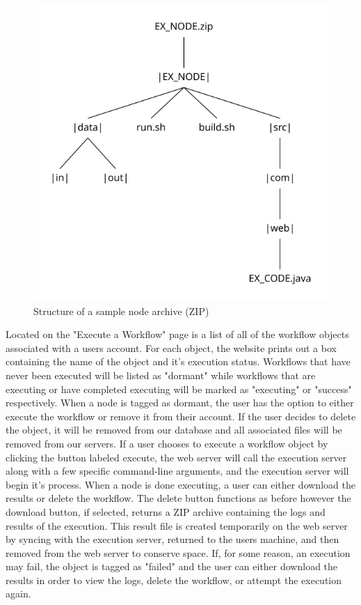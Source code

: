 \documentclass[fleqn,10pt]{SelfArx} %
\begin{document}
\begin{figure}[t!]
\centering
\includegraphics[width=\linewidth]{Figures/node_structure.png}
\caption{Structure of a sample node archive (ZIP)}
\label{fig:nodestructure}
\end{figure}

Located on the "Execute a Workflow" page is a list of all of the workflow objects associated with a users account. For each object, the website prints out a box containing the name of the object and it’s execution status. Workflows that have never been executed will be listed as "dormant" while workflows that are executing or have completed executing will be marked as "executing" or "success" respectively. When a node is tagged as dormant, the user has the option to either execute the workflow or remove it from their account. If the user decides to delete the object, it will be removed from our database and all associated files will be removed from our servers. If a user chooses to execute a workflow object by clicking the button labeled execute, the web server will call the execution server along with a few specific command-line arguments, and the execution server will begin it’s process. When a node is done executing, a user can either download the results or delete the workflow. The delete button functions as before however the download button, if selected, returns a ZIP archive containing the logs and results of the execution. This result file is created temporarily on the web server by syncing with the execution server, returned to the users machine, and then removed from the web server to conserve space. If, for some reason, an execution may fail, the object is tagged as "failed" and the user can either download the results in order to view the logs, delete the workflow, or attempt the execution again.
\end{document}
